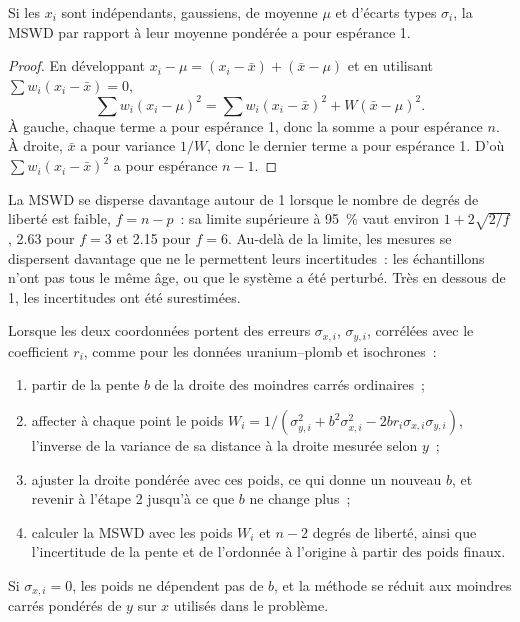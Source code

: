 \begin{proposition}\label{prop:b3:advanced-geochronology:mswd}
Si les $x_i$ sont indépendants, gaussiens, de moyenne $\mu$ et d'écarts types
$\sigma_i$, la MSWD par rapport à leur moyenne pondérée a pour espérance 1.
\end{proposition}

\begin{proof}
En développant $x_i - \mu = (x_i - \bar x) + (\bar x - \mu)$ et en utilisant $\sum
w_i(x_i - \bar x) = 0$,
\[
\sum w_i(x_i - \mu)^2 = \sum w_i(x_i - \bar x)^2 + W(\bar x - \mu)^2.
\]
À gauche, chaque terme a pour espérance 1, donc la somme a pour espérance $n$.
À droite, $\bar x$ a pour variance $1/W$, donc le dernier terme a pour espérance 1.
D'où $\sum w_i(x_i - \bar x)^2$ a pour espérance $n - 1$.
\end{proof}

La MSWD se disperse davantage autour de 1 lorsque le nombre de degrés de liberté est
faible, $f = n - p$~: sa limite supérieure à \qty{95}{\percent} vaut environ $1 +
2\sqrt{2/f}$, 2.63 pour $f = 3$ et 2.15 pour $f = 6$. Au-delà de la limite, les
mesures se dispersent davantage que ne le permettent leurs incertitudes~: les
échantillons n'ont pas tous le même âge, ou que le système a été perturbé. Très
en dessous de 1, les incertitudes ont été surestimées.

\begin{method}\label{met:b3:advanced-geochronology:york}
Lorsque les deux coordonnées portent des erreurs $\sigma_{x,i}$, $\sigma_{y,i}$, corrélées
avec le coefficient $r_i$, comme pour les données uranium--plomb et isochrones~:
\begin{enumerate}
\item partir de la pente $b$ de la droite des moindres carrés ordinaires~;
\item affecter à chaque point le poids $W_i = 1/(\sigma_{y,i}^2 + b^2\sigma_{x,i}^2 -
2br_i\sigma_{x,i}\sigma_{y,i})$, l'inverse de la variance de sa distance à la
droite mesurée selon $y$~;
\item ajuster la droite pondérée avec ces poids, ce qui donne un nouveau $b$, et
revenir à l'étape 2 jusqu'à ce que $b$ ne change plus~;
\item calculer la MSWD avec les poids $W_i$ et $n - 2$ degrés de liberté,
ainsi que l'incertitude de la pente et de l'ordonnée à l'origine à partir des poids finaux.
\end{enumerate}
Si $\sigma_{x,i} = 0$, les poids ne dépendent pas de $b$, et la méthode
se réduit aux moindres carrés pondérés de $y$ sur $x$ utilisés dans le problème.
\end{method}

